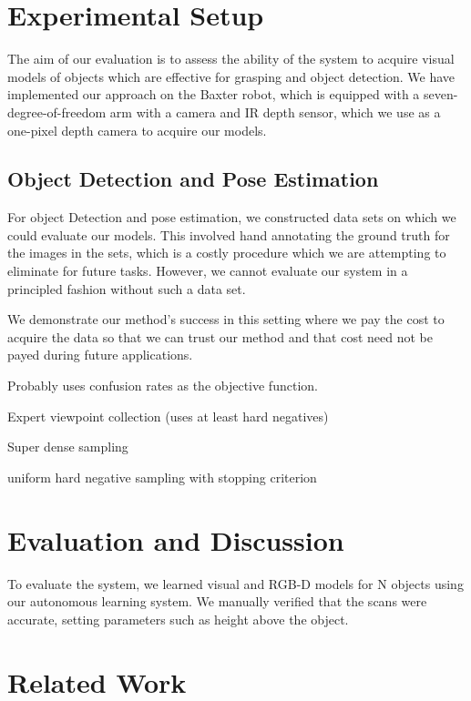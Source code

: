 \documentclass{article}
\begin{document}
 
\section{Experimental Setup}

The aim of our evaluation is to assess the ability of the system to
acquire visual models of objects which are effective for grasping and
object detection.  We have implemented our approach on the Baxter
robot, which is equipped with a seven-degree-of-freedom arm with a
camera and IR depth sensor, which we use as a one-pixel depth camera
to acquire our models.

\subsection{Object Detection and Pose Estimation}

For object Detection and pose estimation, we constructed data sets on
which we could evaluate our models. This involved hand annotating the
ground truth for the images in the sets, which is a costly procedure
which we are attempting to eliminate for future tasks.  However, we
cannot evaluate our system in a principled fashion without such a data
set.

We demonstrate our method's success in this setting where we pay the cost
to acquire the data so that we can trust our method and that cost need not be 
payed during future applications. 

Probably uses confusion rates as the objective function.

Expert viewpoint collection (uses at least hard negatives)

Super dense sampling

uniform hard negative sampling with stopping criterion



\section{Evaluation and Discussion}

To evaluate the system, we learned visual and RGB-D models for N
objects using our autonomous learning system.  We manually verified
that the scans were accurate, setting parameters such as height above
the object.


\section{Related Work}
\end{document}
